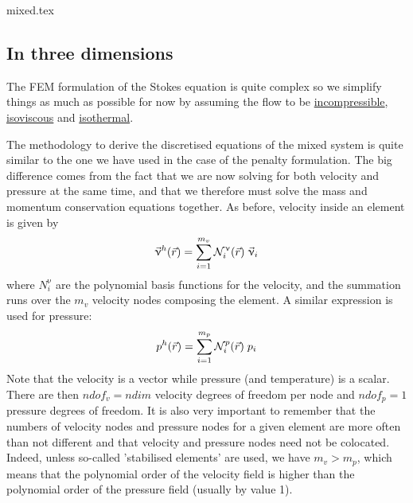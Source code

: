 \begin{flushright} {\tiny {\color{gray} mixed.tex}} \end{flushright}

\subsection{In three dimensions}

The FEM formulation of the Stokes equation is quite complex so 
we simplify things as much as possible for now by 
assuming the flow to be \underline{incompressible}, 
\underline{isoviscous} and \underline{isothermal}. 

The methodology to derive the discretised equations of the mixed system is 
quite similar to the one we have used in the case of the penalty formulation.
The big difference comes from the fact that we are now solving for both 
velocity and pressure at the same time, and that we therefore must solve 
the mass and momentum conservation equations together.
As before, velocity inside an element is given by 
\begin{equation}
{\vec \upnu}^h({\vec r})=\sum_{i=1}^{m_v} {\mathcal{N}}_i^\upnu({\vec r})\;  {\vec \upnu}_i
\label{mixed01}
\end{equation}
where $N_i^{\upnu}$ are the polynomial basis functions for the velocity,
and the summation runs over the $m_v$ velocity nodes composing the element.
A similar expression is used for pressure:
\begin{equation}
p^h({\vec r})=\sum_{i=1}^{m_p} {\mathcal{N}}_i^p({\vec r}) \; p_i
\label{mixed02}
\end{equation}
Note that the velocity is a vector while pressure (and temperature)
is a scalar. There are then $ndof_v=ndim$ velocity degrees of freedom per node
and $ndof_p=1$ pressure degrees of freedom.
It is also very important to remember that the numbers of 
velocity nodes and pressure nodes for a given element 
are more often than not different and that velocity and pressure
nodes need not be colocated. Indeed, unless 
so-called 'stabilised elements' are used, we have $m_v>m_p$, which 
means that the polynomial order of the velocity field is higher than 
the polynomial order of the pressure field (usually by value 1).

